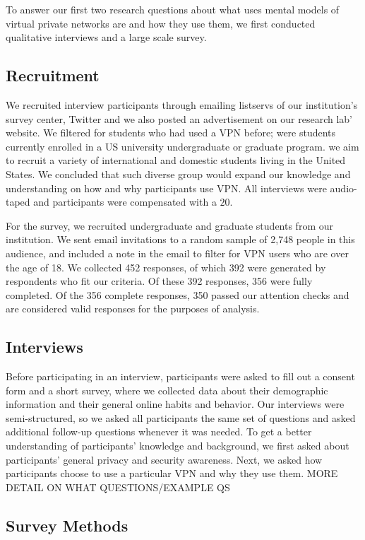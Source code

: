 To answer our first two research questions about  what uses mental models of virtual private networks are and how they use them,  we first conducted qualitative
interviews and a large scale survey. 

\subsection{Recruitment} We recruited interview participants through
emailing listservs of our institution's survey center, Twitter and we also
posted an advertisement on  our research lab' website. We filtered for students who had used a VPN before; were students currently enrolled in a US university undergraduate or graduate program.  we aim to recruit a variety of international and domestic students living in the United States.
We concluded that such diverse group would expand our knowledge and
understanding on how and why participants use VPN. All interviews were audio-taped and participants were compensated with a $20$.

For the survey, we recruited undergraduate and
graduate students from our institution. We sent email invitations to a random sample of 2,748 people in this
audience, and included a note in the email to filter for VPN users who are
over the age of 18. We collected 452 responses, of which 392 were generated by
respondents who fit our criteria. Of these 392 responses, 356 were fully
completed. Of the 356 complete responses, 350 passed our attention checks and
are considered valid responses for the purposes of analysis.

\subsection{Interviews} Before participating in an interview, participants were asked to fill
out a consent form and a short survey,
where we collected data about their demographic information and their general
online habits and behavior. Our interviews were semi-structured, so we asked
all participants the same set of questions and asked additional follow-up
questions whenever it was needed. To get a better
understanding of participants' knowledge and background, we  first asked  about
 participants' general privacy and security awareness. Next, we asked how  participants choose  to use a particular VPN and why they use them. MORE DETAIL ON WHAT QUESTIONS/EXAMPLE QS
 
 \subsection{Survey Methods} 
